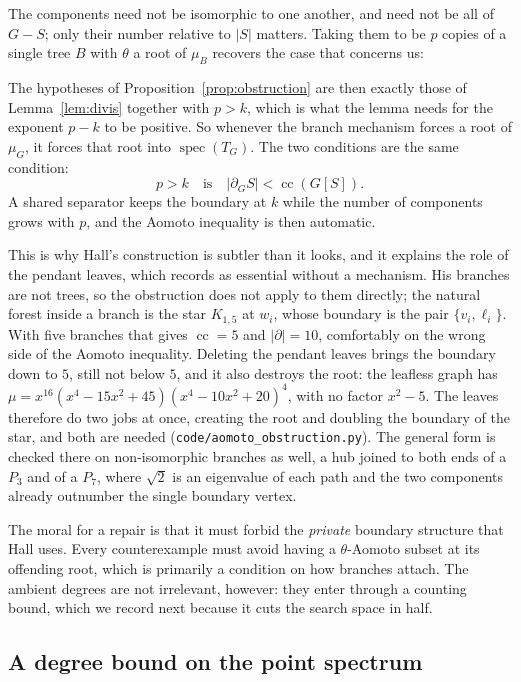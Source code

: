\documentclass[11pt]{article}
\theoremstyle{remark}
\begin{document}
The components need not be isomorphic to one another, and need not be all of $G-S$; only their
number relative to $|S|$ matters. Taking them to be $p$ copies of a single tree $B$ with
$\theta$ a root of $\mu_B$ recovers the case that concerns us:

The hypotheses of Proposition~\ref{prop:obstruction} are then exactly those of
Lemma~\ref{lem:divis} together with $p>k$, which is what the lemma needs for the exponent $p-k$ to
be positive. So
whenever the branch mechanism forces a root of $\mu_G$, it forces that root into
$\operatorname{spec}(T_G)$. The two conditions are the same condition:
\[
  p>k\quad\text{is}\quad |\partial_G S|<\operatorname{cc}(G[S]).
\]
A shared separator keeps the boundary at $k$ while the number of components grows with $p$, and the
Aomoto inequality is then automatic.

This is why Hall's construction is subtler than it looks, and it explains the role of the pendant
leaves, which \cite{Supp} records as essential without a mechanism. His branches are not trees, so
the obstruction does not apply to them directly; the natural forest inside a branch is the star
$K_{1,5}$ at $w_i$, whose boundary is the pair $\{v_i,\ell_i\}$. With five branches that gives
$\operatorname{cc}=5$ and $|\partial|=10$, comfortably on the wrong side of the Aomoto inequality.
Deleting the pendant leaves brings the boundary down to $5$, still not below $5$, and it also
destroys the root: the leafless graph has
$\mu=x^{16}(x^4-15x^2+45)(x^4-10x^2+20)^4$, with no factor $x^2-5$. The leaves therefore do two jobs
at once, creating the root and doubling the boundary of the star, and both are needed
(\texttt{code/aomoto\_obstruction.py}). The general form is checked there on non-isomorphic
branches as well, a hub joined to both ends of a $P_3$ and of a $P_7$, where $\sqrt2$ is an
eigenvalue of each path and the two components already outnumber the single boundary vertex.

The moral for a repair is that it must forbid the \emph{private} boundary structure that Hall uses.
Every counterexample must avoid having a $\theta$-Aomoto subset at its offending root, which is
primarily a condition on how branches attach. The ambient degrees are not irrelevant, however: they
enter through a counting bound, which we record next because it cuts the search space in half.

\subsection{A degree bound on the point spectrum}\label{sec:degbound}
\end{document}
